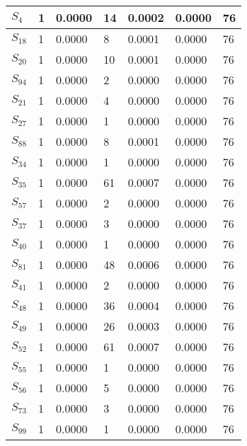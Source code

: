 \begin{xltabular}{\textwidth}{|X|X|X|X|X|X|X|}
 $S_{4}$ & 1 & 0.0000 & 14 & 0.0002 & 0.0000 & 76 \\ \hline
 $S_{18}$ & 1 & 0.0000 & 8 & 0.0001 & 0.0000 & 76 \\ \hline
 $S_{20}$ & 1 & 0.0000 & 10 & 0.0001 & 0.0000 & 76 \\ \hline
 $S_{94}$ & 1 & 0.0000 & 2 & 0.0000 & 0.0000 & 76 \\ \hline
 $S_{21}$ & 1 & 0.0000 & 4 & 0.0000 & 0.0000 & 76 \\ \hline
 $S_{27}$ & 1 & 0.0000 & 1 & 0.0000 & 0.0000 & 76 \\ \hline
 $S_{88}$ & 1 & 0.0000 & 8 & 0.0001 & 0.0000 & 76 \\ \hline
 $S_{34}$ & 1 & 0.0000 & 1 & 0.0000 & 0.0000 & 76 \\ \hline
 $S_{35}$ & 1 & 0.0000 & 61 & 0.0007 & 0.0000 & 76 \\ \hline
 $S_{57}$ & 1 & 0.0000 & 2 & 0.0000 & 0.0000 & 76 \\ \hline
 $S_{37}$ & 1 & 0.0000 & 3 & 0.0000 & 0.0000 & 76 \\ \hline
 $S_{40}$ & 1 & 0.0000 & 1 & 0.0000 & 0.0000 & 76 \\ \hline
 $S_{81}$ & 1 & 0.0000 & 48 & 0.0006 & 0.0000 & 76 \\ \hline
 $S_{41}$ & 1 & 0.0000 & 2 & 0.0000 & 0.0000 & 76 \\ \hline
 $S_{48}$ & 1 & 0.0000 & 36 & 0.0004 & 0.0000 & 76 \\ \hline
 $S_{49}$ & 1 & 0.0000 & 26 & 0.0003 & 0.0000 & 76 \\ \hline
 $S_{52}$ & 1 & 0.0000 & 61 & 0.0007 & 0.0000 & 76 \\ \hline
 $S_{55}$ & 1 & 0.0000 & 1 & 0.0000 & 0.0000 & 76 \\ \hline
 $S_{56}$ & 1 & 0.0000 & 5 & 0.0000 & 0.0000 & 76 \\ \hline
 $S_{73}$ & 1 & 0.0000 & 3 & 0.0000 & 0.0000 & 76 \\ \hline
 $S_{99}$ & 1 & 0.0000 & 1 & 0.0000 & 0.0000 & 76 \\ \hline
    \end{xltabular}
    